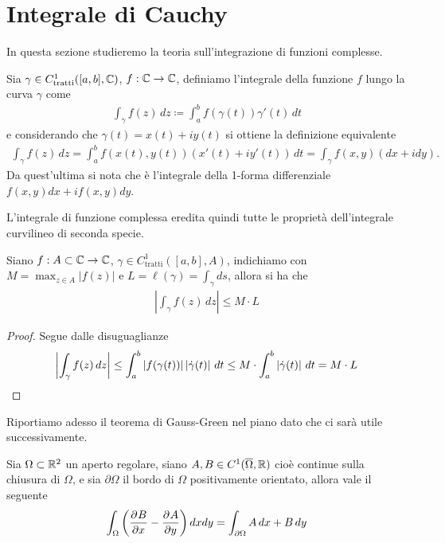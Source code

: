 \section{Integrale di Cauchy}
In questa sezione studieremo la teoria sull'integrazione di funzioni complesse. 
\begin{definition}
  Sia $ \gamma \in C^1_{\text{tratti}}([a,b], \mathbb{C}) $, $ f:\mathbb{C} \to \mathbb{C} $, definiamo l'integrale della funzione $ f $ lungo la curva $ \gamma $ come
  \begin{align}
    \int_\gamma f(z) \,dz \coloneq \int_a^b f(\gamma(t)) \gamma'(t) \,dt
  \end{align}
  e considerando che $ \gamma(t) = x(t) + i y(t) $ si ottiene la definizione equivalente 
  \begin{align}
    \int_\gamma f(z) \,dz = \int_a^b f(x(t), y(t)) \left( x'(t) + i y'(t) \right) \,dt = \int_\gamma f(x, y) (dx + i dy).
  \end{align}
  Da quest'ultima si nota che è l'integrale della 1-forma differenziale $ f(x,y)dx + i f(x,y) dy $.
\end{definition}
L'integrale di funzione complessa eredita quindi tutte le proprietà dell'integrale curvilineo di seconda specie. 
\begin{lemma}[ di Darboux ]
  Siano $ f:A\subset \mathbb{C} \to \mathbb{C} $, $ \gamma \in C^1_{\text{tratti}}([a,b], A) $, indichiamo con $ M = \max_{z \in A}|f(z)| $ e 
  $ L = \ell(\gamma) = \int_\gamma ds $, allora si ha che 
  \begin{align}
    \left| \int_\gamma f(z) \,dz \right| \leq M \cdot L
  \end{align}
\end{lemma}
\begin{proof}
  Segue dalle disuguaglianze
  \begin{align}
    \left| \int_\gamma f(z) \,dz \right| \leq \int_a^b |f(\gamma(t))| \left|{\dot{\gamma}(t)}\right| \,dt \leq M \cdot \int_a^b \left|{\dot{\gamma}(t)}\right| \,dt 
    = M \cdot L
  \end{align}
\end{proof}
Riportiamo adesso il teorema di Gauss-Green nel piano dato che ci sarà utile successivamente.
\begin{theorem}
  Sia $ \Omega \subset \mathbb{R}^2 $ un aperto regolare, siano $ A,B \in C^1(\overline{\Omega}, \mathbb{R}) $ cioè continue sulla chiusura di $ \Omega $, e sia 
  $ \partial\Omega $ il bordo di $ \Omega $ positivamente orientato, allora vale il seguente
  \begin{align}
    \int_\Omega \left( \frac{\partial^{} {B}}{\partial {x}^{}} - \frac{\partial^{} {A}}{\partial {y}^{}} \right) dx dy = \int_{\partial\Omega} A \,dx + B \,dy
  \end{align}
\end{theorem}


